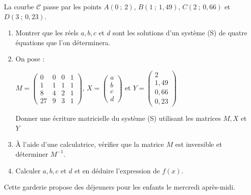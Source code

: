 \par
La courbe $\mathscr{C}$ passe par les points $A(0~;~2)$, $B(1~;~1,49)$, $C(2~;~0,66)$ et $D(3~;~0,23)$.
\par
\begin{enumerate}
     \item %
     Montrer que les réels $a, b, c$ et $d$ sont les solutions d'un système (S) de quatre équations que l'on déterminera.
     \item %
     On pose :
     \begin{center}
          $M = \begin{pmatrix}
               0 &0 &0 &1 \\
               1 &1 &1 &1 \\
               8 &4 &2 &1 \\
          27 &9 &3 &1  \end{pmatrix}$,
          $     X = \begin{pmatrix}
               a \\
               b \\
               c \\
          d  \end{pmatrix} $
          et
          $   Y = \begin{pmatrix}
               2 \\
               1,49 \\
               0,66 \\
          0,23 \end{pmatrix}$
     \end{center}
     Donner une écriture matricielle du système (S) utilisant les matrices $M, X$ et $Y$
     \item %
     \`A l'aide d'une calculatrice, vérifier que la matrice $M$ est inversible et déterminer $M^{-1}$.
     \item %
     Calculer $a, b, c$ et $d$ et en déduire l'expression de $f(x)$.
     \par
\end{enumerate}
\par
%
%
\par
Cette garderie propose des déjeuners pour les enfants le mercredi après-midi.
\par
